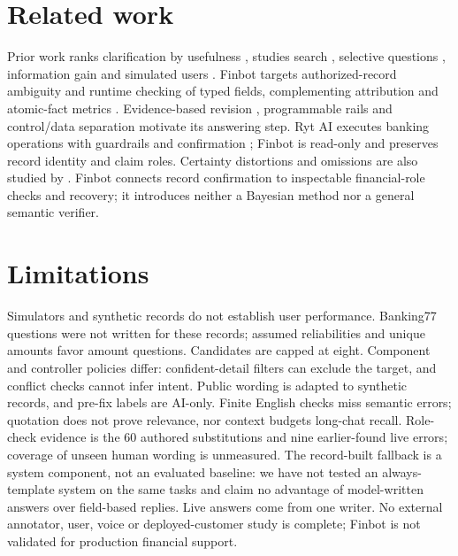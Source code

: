 \documentclass[11pt]{article}
\begin{document}
\section{Related work}

Prior work ranks clarification by usefulness \citep{rao-daume-iii-2018-learning}, studies search
\citep{aliannejadi2019asking,zhang2020evaluating}, selective questions \citep{kuhn2022clam},
information gain \citep{piriyakulkij2023active,li2025eliciting} and simulated users \citep{sekulic2022evaluating}.
Finbot targets authorized-record ambiguity and runtime checking of typed fields, complementing
attribution and atomic-fact metrics \citep{rashkin-etal-2023-measuring,min-etal-2023-factscore}.
Evidence-based revision \citep{gao-etal-2023-rarr}, programmable rails \citep{rebedea-etal-2023-nemo}
and control/data separation \citep{debenedetti2025camel} motivate its answering step.
Ryt AI executes banking operations with guardrails and confirmation
\citep{chua-etal-2025-banking}; Finbot is read-only and preserves record identity and claim roles.
Certainty distortions and omissions are also studied by \citet{nnamdi-etal-2026-epistemic}.
Finbot connects record confirmation to inspectable financial-role checks and recovery;
it introduces neither a Bayesian method nor a general semantic verifier.

\section{Limitations}

Simulators and synthetic records do not establish user performance. Banking77 questions were not
written for these records; assumed reliabilities and unique amounts favor amount questions.
Candidates are capped at eight. Component and controller
policies differ: confident-detail filters can exclude the target, and conflict checks cannot
infer intent. Public wording is adapted to synthetic records, and pre-fix labels are AI-only. Finite English checks
miss semantic errors; quotation does not prove relevance, nor context budgets long-chat recall.
Role-check evidence is the 60 authored substitutions and nine earlier-found live errors;
coverage of unseen human wording is unmeasured. The record-built fallback is a system component,
not an evaluated baseline: we have not tested an always-template system on the same tasks and
claim no advantage of model-written answers over field-based replies.
Live answers come from one writer. No external annotator, user, voice or
deployed-customer study is complete; Finbot is not validated for production financial support.
\end{document}
